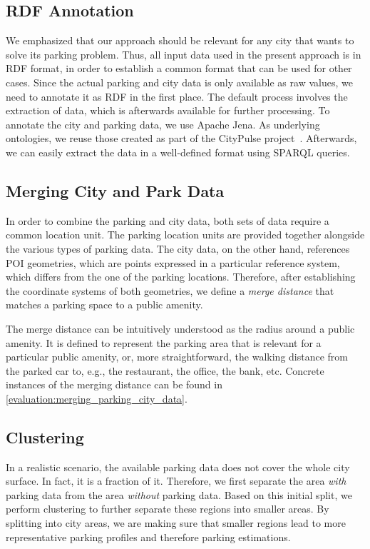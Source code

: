 \subsection{RDF Annotation}
We emphasized that our approach should be relevant for any city that wants to solve its parking problem. Thus, all input data used in the present approach is in RDF format, in order to establish a common format that can be used for other cases.
Since the actual parking and city data is only available as raw values, we need to annotate it as RDF in the first place.
The default process involves the extraction of data, which is afterwards available for further processing. To annotate the city and parking data, we use Apache Jena. As underlying ontologies, we reuse those created as part of the CityPulse project~\cite{city_pulse}. Afterwards, we can easily extract the data in a well-defined format using SPARQL queries. 

\subsection{Merging City and Park Data}
In order to combine the parking and city data, both sets of data require a common location unit. 
The parking location units are provided together alongside the various types of parking data. 
The city data, on the other hand, references POI geometries, which are points expressed in a particular reference system, which differs from the one of the parking locations.
Therefore, after establishing the coordinate systems of both geometries, we define a \textit{merge distance} that matches a parking space to a public amenity. 

The merge distance can be intuitively understood as the radius around a public amenity. It is defined to represent the parking area that is relevant for a particular public amenity, or, more straightforward, the walking distance from the parked car to, e.g., the restaurant, the office, the bank, etc. Concrete instances of the merging distance can be found in \ref{evaluation:merging_parking_city_data}.

\subsection{Clustering}
\label{concept:clustering}
In a realistic scenario, the available parking data does not cover the whole city surface. In fact, it is a fraction of it. Therefore, we first separate the area \textit{with} parking data from the area \textit{without} parking data. Based on this initial split, we perform clustering to further separate these regions into smaller areas. By splitting into city areas, we are making sure that smaller regions lead to more representative parking profiles and therefore parking estimations. 

